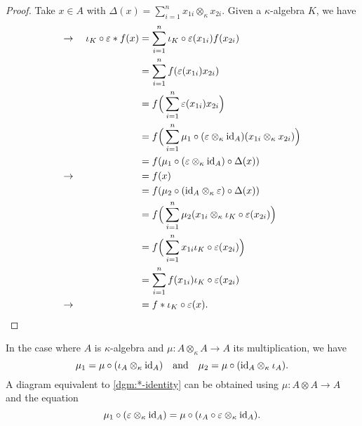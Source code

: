 \begin{proof}
    Take $x\in A$ with $\Delta(x)=\sum_{i=1}^nx_{1i}\otimes_\kappa x_{2i}$. Given a $\kappa$-algebra $K$, we have
    \begin{align*}
        \to\quad\iota_K\circ\varepsilon * f(x)
            &= \sum_{i=1}^n\iota_K\circ\varepsilon(x_{1i})f(x_{2i})\\
            &=
            \sum_{i=1}^nf(\varepsilon(x_{1i})x_{2i})\\
            &= f\Big(\sum_{i=1}^n\varepsilon(x_{1i})x_{2i}\Big)\\
            &= f\Big(
                \sum_{i=1}^n
                    \mu_1\circ(\varepsilon\otimes_\kappa\text{\rm id}_A)
                        (x_{1i}\otimes_\kappa x_{2i})
                \Big)\\
            &= f(
                \mu_1\circ(\varepsilon\otimes_\kappa\text{\rm id}_A)\circ\Delta(x)
                )\\
        \to\quad\hphantom{\iota_K\circ\varepsilon * f(x)} &= f(x)\\
            &= f(
                \mu_2\circ(\text{\rm id}_A\otimes_\kappa\varepsilon)\circ\Delta(x)
                )\\
            &= f\Big(
                \sum_{i=1}^n\mu_2(x_{1i}\otimes_\kappa\iota_K\circ\varepsilon(x_{2i})
                \Big)\\
            &= f\Big(\sum_{i=1}^nx_{1i}\iota_K\circ\varepsilon(x_{2i})\Big)\\
            &= \sum_{i=1}^nf(x_{1i})\iota_K\circ\varepsilon(x_{2i})\\
        \to\quad\hphantom{\iota_K\circ\varepsilon * f(x)} &= f*\iota_K\circ\varepsilon(x).
    \end{align*}
    \normalsize
\end{proof}

\begin{rem}
    In the case where $A$ is $\kappa$-algebra and $\mu\colon A\otimes_\kappa A\to A$ its multiplication, we have
    $$
        \mu_1=\mu\circ(\iota_A\otimes_\kappa\text{\rm id}_A)
        \quad\text{and}\quad
        \mu_2=\mu\circ(\text{\rm id}_A\otimes_\kappa\iota_A).
    $$
    A diagram equivalent to \eqref{dgm:*-identity} can be obtained using $\mu\colon A\otimes A\to A$ and the equation
    \begin{equation}\label{eq:mu-iota-varepsilon}
        \mu_1\circ(\varepsilon\otimes_\kappa\text{\rm id}_A)
        =
        \mu\circ(\iota_A\circ\varepsilon\otimes_\kappa\text{\rm id}_A).
    \end{equation}
\end{rem}

